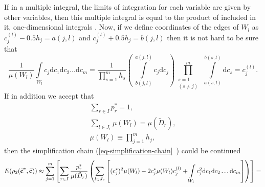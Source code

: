 If in a multiple integral, the limits of integration for each variable are given by other variables, then this multiple integral is equal to the product of included in it, one-dimensional integrals  \cite{stewart_2008_int}. Now, if we define coordinates of the edges of $W_{l}$ as $c_{j}^{(l)} - 0.5h_{j} = a(j,l)$ and $c_{j}^{(l)} + 0.5h_{j} = b(j,l)$ then it is not hard to be sure that 
\begin{equation}
\frac{1}{\mu(W_{l})} \int\limits_{W_l} c_{j} \mathrm{d} c_{1} \mathrm{d} c_{2} \ldots  \mathrm{d} c_{m} 
	= \dfrac{1}{\prod\limits_{s=1}^{m}h_{s}}
	\left( \  \int\limits_{b(j,l)}^{a(j,l)} c_{j}  \mathrm{d} c_{j}\right) 
	\prod_{\substack{s=1\\ (s\ne j)}}^m \ 
	\int\limits_{a(s,l)}^{b(s,l)} \!  \mathrm{d} c_{s} 
	= c_{j}^{(l)}.
\end{equation}
If in addition we accept that
\begin{gather}
\sum\limits_{r \in I} p_{r}^{*} =1, \\
\sum\limits_{l \in J_{r}} \mu(W_{l}) =\mu(\tilde{D}_{r}), \\
\mu(W_{l}) \equiv \prod\limits_{j=1}^{m}h_{j},
\end{gather}
then the simplification chain (\vref{eq-simplification-chain}~) could be continued
\begin{gather}
\nonumber
E(\rho_{2}(\vec{\textbf{c}}^{*},\vec{\textbf{c}})) \approx \sum\limits_{j=1}^{m}  \left[ \sum\limits_{r \in I} \frac{p_{r}^{*}}{\mu(\tilde{D}_{r})} \left( \sum\limits_{l \in J_{r}} \left[ (c_{j}^{*})^{2} \mu(W_{l}) - 2c_{j}^{*} \mu(W_{l}) c_{j}^{(l)} + \int\limits_{W_{l}} c_{j}^{2} \mathrm{d}c_{1} \mathrm{d}c_{2} \dots \mathrm{d}c_{m} \right] \right) \right] = 
\end{gather}
